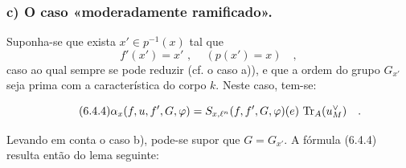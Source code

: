 \subsubsection*{c) O caso «moderadamente ramificado».} Suponha-se que exista $x' \in p^{-1}(x)$ tal que
\[
f'(x') = x' \text{ , } \quad (p(x') = x) \quad ,
\]
caso ao qual sempre se pode reduzir (cf. o caso a)), e que a ordem do grupo $G_{x'}$ seja prima com a característica do corpo $k$. Neste caso, tem-se:

\begin{equation}\tag{6.4.4}
\alpha_x(f,u, f', G, \varphi) = S_{x,\ell^n}(f, f', G, \varphi)(e) \, \operatorname{Tr}_A(u_M^\vee) \quad .
\end{equation}

Levando em conta o caso b), pode-se supor que $G = G_{x'}$. A fórmula (6.4.4) resulta então do lema seguinte:
